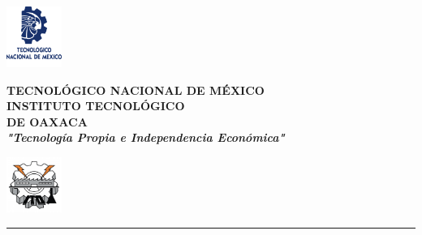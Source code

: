 \begin{titlepage}

    
    \begin{center}
        \begin{minipage}{2.5cm}
            \begin{center}
                \includegraphics[width=1.8cm]{images/logo-tecnm}
            \end{center}
        \end{minipage}\hfill
        \begin{minipage}{10cm}
            \begin{center}
                {\large \textbf{TECNOLÓGICO NACIONAL DE MÉXICO}}\\[0.2cm]
                {\LARGE \textbf{INSTITUTO TECNOLÓGICO}\\[0.1cm] \textbf{DE OAXACA}}\\[0.2cm]
                {\normalsize \textbf{\textit{"Tecnología Propia e Independencia Económica"}}}
            \end{center}
        \end{minipage}\hfill
        \begin{minipage}{2.5cm}
            \begin{center}
                \includegraphics[width=1.8cm]{images/logo-ito}
            \end{center}
        \end{minipage}

        \rule[1cm]{\textwidth}{3pt}

        \vspace{-0.5cm}
        \LARGE
        \underline{\textbf{\myAsignature}} \\[0.1cm]
        \small
        \myClave


\end{center}
\end{titlepage}
